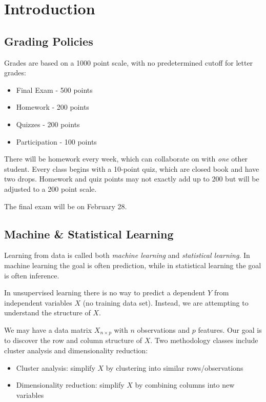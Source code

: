 \section{Introduction}

\bigskip

\subsection{Grading Policies}

\medskip

Grades are based on a 1000 point scale, with no predetermined cutoff for letter grades:
\begin{itemize}
    \item Final Exam - 500 points
    \item Homework - 200 points
    \item Quizzes - 200 points
    \item Participation - 100 points
\end{itemize}

\medskip

There will be homework every week, which can collaborate on with \textit{one} other student. Every class begins with a 10-point quiz, which are closed book and have two drops. Homework and quiz points may not exactly add up to 200 but will be adjusted to a 200 point scale. 

The final exam will be on February 28.


\bigskip

\subsection{Machine \& Statistical Learning}

\medskip

Learning from data is called both \textit{machine learning} and \textit{statistical learning}. In machine learning the goal is often prediction, while in statistical learning the goal is often inference. 

In unsupervised learning there is no way to predict a dependent $Y$ from independent variables $X$ (no training data set). Instead, we are attempting to understand the structure of $X$. 

We may have a data matrix $X_{n\times p}$ with $n$ observations and $p$ features. Our goal is to discover the row and column structure of $X$. Two methodology classes include cluster analysis and dimensionality reduction:

\begin{itemize}
    \item Cluster analysis: simplify $X$ by clustering into similar rows/observations
    \item Dimensionality reduction: simplify $X$ by combining columns into new variables
\end{itemize}

